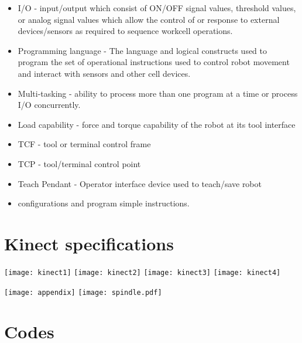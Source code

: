 \begin{itemize}
    \item I/O - input/output which consist of ON/OFF signal values, threshold values, or analog signal values which allow the control of or response to external devices/sensors as required to sequence workcell operations.
    \item Programming language - The language and logical constructs used to program the set of operational instructions used to control robot movement and interact with sensors and other cell devices.
    \item Multi-tasking - ability to process more than one program at a time or process I/O concurrently.
    \item Load capability - force and torque capability of the robot at its tool interface
    \item TCF - tool or terminal control frame
    \item TCP - tool/terminal control point
    \item Teach Pendant - Operator interface device used to teach/save robot \item configurations and program simple instructions.
\end{itemize}

\newpage
\section{Kinect specifications}
\begin{center}
\texttt{[image: kinect1]}	
\texttt{[image: kinect2]}
\texttt{[image: kinect3]}
\texttt{[image: kinect4]}
\end{center}

\newpage
\texttt{[image: appendix]}
\newpage
\texttt{[image: spindle.pdf]}


\newpage
\section{Codes}
